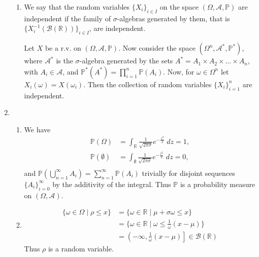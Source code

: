\documentclass[pstricks, 11pt,a4paper]{article}
\theoremstyle{theorem}
\begin{document}
\begin{enumerate}
\begin{enumerate}
          \item
                We say that the random variables $\{X_{i}\}_{i\in I}$ on the space $(\Omega, \mathcal{A}, \mathbb{P})$ are independent if the family of $\sigma$-algebras generated by them, that is $\{X_{i}^{-1}(\mathcal{B}(\mathbb{R}))\}_{i\in I}$, are independent.

                Let $X$ be a r.v. on $(\Omega, \mathcal{A}, \mathbb{P})$. Now consider the space $(\Omega^{n}, \mathcal{A}^{*}, \mathbb{P}^{*})$, where $\mathcal{A}^{*}$ is the $\sigma$-algebra generated by the sets $A^{*}=A_{1}\times A_{2}\times ... \times A_{n}$, with $A_{i}\in\mathcal{A}$, and $\mathbb{P}^{*}(A^{*})=\prod_{i=1}^{n}\mathbb{P}(A_{i})$. Now, for $\omega\in\Omega^{n}$ let $X_{i}(\omega)=X(\omega_{i})$. Then the collection of random variables $\{X_{i}\}_{i=1}^{n}$ are independent.


        \end{enumerate}

  \item
        \begin{enumerate}
          \item We have
                \begin{align*}
                \mathbb{P}(\Omega) &= \int_{\mathbb{R}} \frac{1}{\sqrt{2\pi\sigma}}e^{-\frac{z^{2}}{2}}\;dz = 1, \\
                  \mathbb{P}(\emptyset) &= \int_{\mathbb{\emptyset}} \frac{1}{\sqrt{2\pi\sigma}}e^{-\frac{z^{2}}{2}}\;dz = 0, \\
                  \end{align*}
                and $\mathbb{P}(\bigcup_{n=1}^{\infty}A_{i}) = \sum_{n=1}^{\infty}\mathbb{P}(A_{i})$ trivially for disjoint sequences $\{A_{i}\}_{i=0}^{\infty}$ by the additivity of the integral. Thus $\mathbb{P}$ is a probability measure on $(\Omega, \mathcal{A})$.

          \item
                \begin{align*}
                  \{\omega \in \Omega \mid \rho\leq x\} &= \{\omega\in \mathbb{R}\mid \mu + \sigma\omega\leq x\} \\
                    &= \{\omega\in \mathbb{R}\mid \omega\leq \frac{1}{\omega}(x-\mu)\} \\
                  &= \left(-\infty, \frac{1}{\omega}(x-\mu)\right] \in \mathcal{B}(\mathbb{R})
                \end{align*}
                Thus $\rho$ is a random variable.


\end{enumerate}
\end{enumerate}
\end{document}
